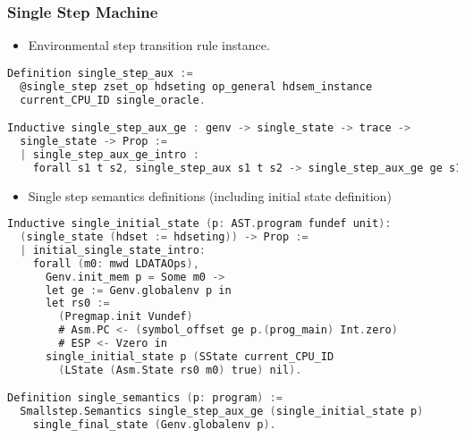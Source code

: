 \subsubsection{Single Step Machine}    
\begin{itemize}[leftmargin=*]
\item Environmental step transition rule instance.
\end{itemize}
\begin{lstlisting}[language=C]
Definition single_step_aux :=
  @single_step zset_op hdseting op_general hdsem_instance 
  current_CPU_ID single_oracle.

Inductive single_step_aux_ge : genv -> single_state -> trace -> 
  single_state -> Prop :=
  | single_step_aux_ge_intro : 
    forall s1 t s2, single_step_aux s1 t s2 -> single_step_aux_ge ge s1 t s2.
\end{lstlisting}


\begin{itemize}[leftmargin=*]
\item Single step semantics definitions (including initial state definition)
\end{itemize}
\begin{lstlisting}[language=C]
Inductive single_initial_state (p: AST.program fundef unit): 
  (single_state (hdset := hdseting)) -> Prop :=
  | initial_single_state_intro: 
    forall (m0: mwd LDATAOps),
      Genv.init_mem p = Some m0 ->
      let ge := Genv.globalenv p in
      let rs0 :=
        (Pregmap.init Vundef)
        # Asm.PC <- (symbol_offset ge p.(prog_main) Int.zero)
        # ESP <- Vzero in
      single_initial_state p (SState current_CPU_ID 
        (LState (Asm.State rs0 m0) true) nil).

Definition single_semantics (p: program) :=
  Smallstep.Semantics single_step_aux_ge (single_initial_state p) 
    single_final_state (Genv.globalenv p).
\end{lstlisting}

%


